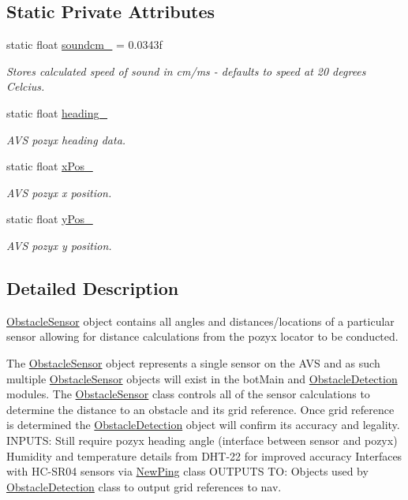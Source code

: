 \subsection*{Static Private Attributes}
\begin{DoxyCompactItemize}
\item 
static float \mbox{\hyperlink{class_obstacle_sensor_ae6d0b250f37a34d04103d43e4e4e0082}{soundcm\+\_\+}} = 0.\+0343f
\begin{DoxyCompactList}\small\item\em Stores calculated speed of sound in cm/ms -\/ defaults to speed at 20 degrees Celcius. \end{DoxyCompactList}\item 
static float \mbox{\hyperlink{class_obstacle_sensor_add4a6ffaf43bcdd08e1a8c0c3956605d}{heading\+\_\+}}
\begin{DoxyCompactList}\small\item\em A\+VS pozyx heading data. \end{DoxyCompactList}\item 
static float \mbox{\hyperlink{class_obstacle_sensor_a108284bfc4bc3ded9aa47973a9d3a442}{x\+Pos\+\_\+}}
\begin{DoxyCompactList}\small\item\em A\+VS pozyx x position. \end{DoxyCompactList}\item 
static float \mbox{\hyperlink{class_obstacle_sensor_a5b34f3938826987d0b1623bb95e4220e}{y\+Pos\+\_\+}}
\begin{DoxyCompactList}\small\item\em A\+VS pozyx y position. \end{DoxyCompactList}\end{DoxyCompactItemize}


\subsection{Detailed Description}
\mbox{\hyperlink{class_obstacle_sensor}{Obstacle\+Sensor}} object contains all angles and distances/locations of a particular sensor allowing for distance calculations from the pozyx locator to be conducted. 

The \mbox{\hyperlink{class_obstacle_sensor}{Obstacle\+Sensor}} object represents a single sensor on the A\+VS and as such multiple \mbox{\hyperlink{class_obstacle_sensor}{Obstacle\+Sensor}} objects will exist in the bot\+Main and \mbox{\hyperlink{class_obstacle_detection}{Obstacle\+Detection}} modules. The \mbox{\hyperlink{class_obstacle_sensor}{Obstacle\+Sensor}} class controls all of the sensor calculations to determine the distance to an obstacle and its grid reference. Once grid reference is determined the \mbox{\hyperlink{class_obstacle_detection}{Obstacle\+Detection}} object will confirm its accuracy and legality. I\+N\+P\+U\+TS\+: Still require pozyx heading angle (interface between sensor and pozyx) Humidity and temperature details from D\+H\+T-\/22 for improved accuracy Interfaces with H\+C-\/\+S\+R04 sensors via \mbox{\hyperlink{class_new_ping}{New\+Ping}} class O\+U\+T\+P\+U\+TS TO\+: Objects used by \mbox{\hyperlink{class_obstacle_detection}{Obstacle\+Detection}} class to output grid references to nav. 

